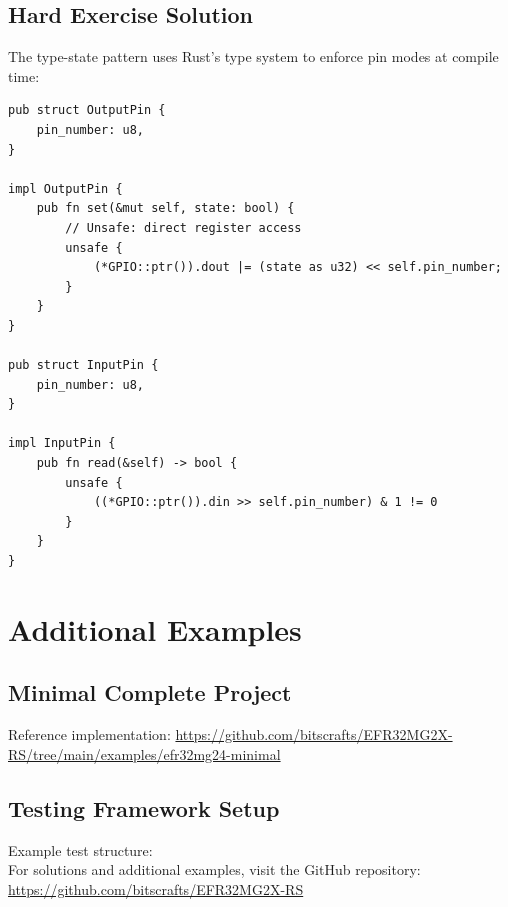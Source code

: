 \subsection{Hard Exercise Solution}
\label{subsec:solution-hard}

The type-state pattern uses Rust's type system to enforce pin modes at compile time:

\begin{verbatim}
pub struct OutputPin {
    pin_number: u8,
}

impl OutputPin {
    pub fn set(&mut self, state: bool) {
        // Unsafe: direct register access
        unsafe {
            (*GPIO::ptr()).dout |= (state as u32) << self.pin_number;
        }
    }
}

pub struct InputPin {
    pin_number: u8,
}

impl InputPin {
    pub fn read(&self) -> bool {
        unsafe {
            ((*GPIO::ptr()).din >> self.pin_number) & 1 != 0
        }
    }
}
\end{verbatim}

\section{Additional Examples}
\label{sec:additional-examples}

\subsection{Minimal Complete Project}
\label{subsec:minimal-complete}

Reference implementation: \url{https://github.com/bitscrafts/EFR32MG2X-RS/tree/main/examples/efr32mg24-minimal}

\subsection{Testing Framework Setup}
\label{subsec:testing-setup}

Example test structure:\\[2em]
For solutions and additional examples, visit the GitHub repository:\\[1em]
\url{https://github.com/bitscrafts/EFR32MG2X-RS}

